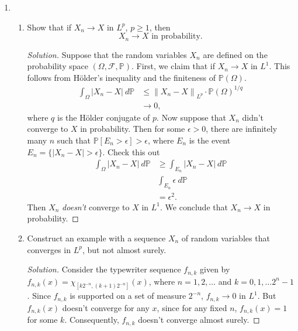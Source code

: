 \documentclass[11pt,letterpaper]{report}
\newcommand{\mcal}[1]{\mathcal{#1}}
\newcommand{\Lp}[2]{\left\|{#1}\right\|_{L^{#2}}}
\newcommand{\prob}{\mathbb{P}}
\newenvironment{solution}
{\begin{proof}[Solution]}
{\end{proof}}
\begin{document}
\begin{enumerate}
	\item \begin{enumerate}
		\item Show that if $X_n\to X$ in $L^p$, $p\geq 1$, then
		\[
		X_n\to X\text{ in probability.}
		\]
		\begin{solution}
			Suppose that the random variables $X_n$ are defined on the probability space $(\Omega, \mcal{F}, \prob)$. First, we claim that if $X_n\to X$ in $L^1$. This follows from H\"older's inequality and the finiteness of $\prob(\Omega)$.
			\begin{align*}
				\int_\Omega|X_n - X|\ d\prob &\leq \Lp{X_n - X}{p}\cdot \prob(\Omega)^{1/q}\\
				&\to 0,
			\end{align*}
			where $q$ is the H\"older conjugate of $p$. Now suppose that $X_n$ didn't converge to $X$ in probability. Then for some $\epsilon>0$, there are infinitely many $n$ such that $\prob[E_n>\epsilon] > \epsilon$, where $E_n$ is the event $E_n = \{|X_n - X|>\epsilon\}$. Check this out
			\begin{align*}
				\int_\Omega|X_n - X|\ d\prob &\geq \int_{E_n}|X_n - X|\ d\prob\\
				& \int_{E_n}\epsilon\ d\prob\\
				&= \epsilon^2.
			\end{align*}
			Then $X_n$ \textit{doesn't} converge to $X$ in $L^1$. We conclude that $X_n\to X$ in probability.
		\end{solution}

		\item Construct an example with a sequence $X_n$ of random variables that converges in $L^p$, but not almost surely.
		\begin{solution}
			Consider the typewriter sequence $f_{n,k}$ given by $f_{n,k}(x) = \chi_{[k2^{-n}, (k+1)2^{-n}]}(x)$, where $n = 1, 2, \ldots$ and $k = 0, 1, \ldots 2^n-1$. Since $f_{n,k}$ is supported on a set of measure $2^{-n}$, $f_{n,k}\to 0$ in $L^1$. But $f_{n,k}(x)$ doesn't converge for any $x$, since for any fixed $n$, $f_{n,k}(x) = 1$ for some $k$. Consequently, $f_{n,k}$ doesn't converge almost surely.
		\end{solution}
	\end{enumerate}


\end{enumerate}
\end{document}
